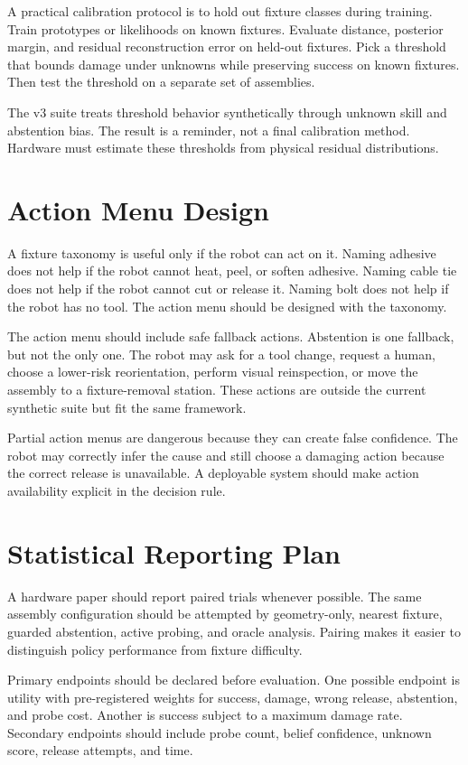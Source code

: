 \documentclass{article}
\begin{document}
A practical calibration protocol is to hold out fixture classes during
training. Train prototypes or likelihoods on known fixtures. Evaluate distance,
posterior margin, and residual reconstruction error on held-out fixtures. Pick
a threshold that bounds damage under unknowns while preserving success on
known fixtures. Then test the threshold on a separate set of assemblies.

The v3 suite treats threshold behavior synthetically through unknown skill and
abstention bias. The result is a reminder, not a final calibration method.
Hardware must estimate these thresholds from physical residual distributions.

\section{Action Menu Design}

A fixture taxonomy is useful only if the robot can act on it. Naming adhesive
does not help if the robot cannot heat, peel, or soften adhesive. Naming cable
tie does not help if the robot cannot cut or release it. Naming bolt does not
help if the robot has no tool. The action menu should be designed with the
taxonomy.

The action menu should include safe fallback actions. Abstention is one
fallback, but not the only one. The robot may ask for a tool change, request a
human, choose a lower-risk reorientation, perform visual reinspection, or move
the assembly to a fixture-removal station. These actions are outside the
current synthetic suite but fit the same framework.

Partial action menus are dangerous because they can create false confidence.
The robot may correctly infer the cause and still choose a damaging action
because the correct release is unavailable. A deployable system should make
action availability explicit in the decision rule.

\section{Statistical Reporting Plan}

A hardware paper should report paired trials whenever possible. The same
assembly configuration should be attempted by geometry-only, nearest fixture,
guarded abstention, active probing, and oracle analysis. Pairing makes it
easier to distinguish policy performance from fixture difficulty.

Primary endpoints should be declared before evaluation. One possible endpoint
is utility with pre-registered weights for success, damage, wrong release,
abstention, and probe cost. Another is success subject to a maximum damage
rate. Secondary endpoints should include probe count, belief confidence,
unknown score, release attempts, and time.
\end{document}
